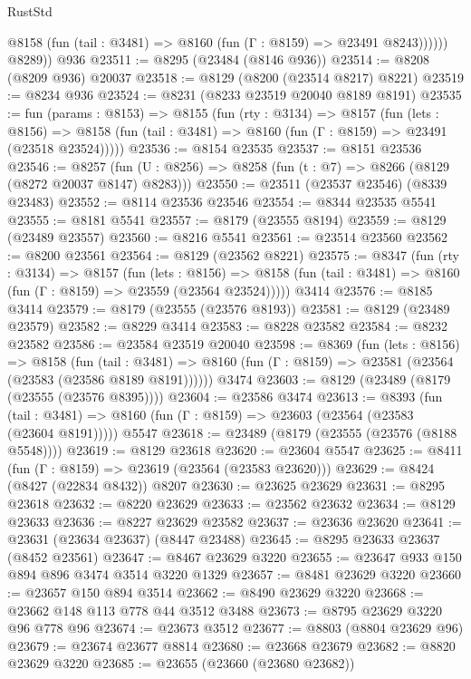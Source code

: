 \begin{lexlean}{RustStd}
\begin{coremodule}
              @8158 (fun (tail : @3481) => @8160 (fun (Γ : @8159) => @23491 @8243))))))
        @8289))
    @936
@23511 := @8295 (@23484 (@8146 @936))
@23514 := @8208 (@8209 @936) @20037
@23518 := @8129 (@8200 (@23514 @8217) @8221)
@23519 := @8234 @936
@23524 := @8231 (@8233 @23519 @20040 @8189 @8191)
@23535 := fun (params : @8153) =>
  @8155
    (fun (rty : @3134) =>
    @8157
      (fun (lets : @8156) =>
      @8158 (fun (tail : @3481) => @8160 (fun (Γ : @8159) => @23491 (@23518 @23524)))))
@23536 := @8154 @23535
@23537 := @8151 @23536
@23546 := @8257
    (fun (U : @8256) => @8258 (fun (t : @7) => @8266 (@8129 (@8272 @20037 @8147) @8283)))
@23550 := @23511 (@23537 @23546) (@8339 @23483)
@23552 := @8114 @23536 @23546
@23554 := @8344 @23535 @5541
@23555 := @8181 @5541
@23557 := @8179 (@23555 @8194)
@23559 := @8129 (@23489 @23557)
@23560 := @8216 @5541
@23561 := @23514 @23560
@23562 := @8200 @23561
@23564 := @8129 (@23562 @8221)
@23575 := @8347
    (fun (rty : @3134) =>
    @8157
      (fun (lets : @8156) =>
      @8158 (fun (tail : @3481) => @8160 (fun (Γ : @8159) => @23559 (@23564 @23524)))))
    @3414
@23576 := @8185 @3414
@23579 := @8179 (@23555 (@23576 @8193))
@23581 := @8129 (@23489 @23579)
@23582 := @8229 @3414
@23583 := @8228 @23582
@23584 := @8232 @23582
@23586 := @23584 @23519 @20040
@23598 := @8369
    (fun (lets : @8156) =>
    @8158
      (fun (tail : @3481) =>
      @8160 (fun (Γ : @8159) => @23581 (@23564 (@23583 (@23586 @8189 @8191))))))
    @3474
@23603 := @8129 (@23489 (@8179 (@23555 (@23576 @8395))))
@23604 := @23586 @3474
@23613 := @8393
    (fun (tail : @3481) => @8160 (fun (Γ : @8159) => @23603 (@23564 (@23583 (@23604 @8191)))))
    @5547
@23618 := @23489 (@8179 (@23555 (@23576 (@8188 @5548))))
@23619 := @8129 @23618
@23620 := @23604 @5547
@23625 := @8411 (fun (Γ : @8159) => @23619 (@23564 (@23583 @23620)))
@23629 := @8424 (@8427 (@22834 @8432)) @8207
@23630 := @23625 @23629
@23631 := @8295 @23618
@23632 := @8220 @23629
@23633 := @23562 @23632
@23634 := @8129 @23633
@23636 := @8227 @23629 @23582
@23637 := @23636 @23620
@23641 := @23631 (@23634 @23637) (@8447 @23488)
@23645 := @8295 @23633 @23637 (@8452 @23561)
@23647 := @8467 @23629 @3220
@23655 := @23647 @933 @150 @894 @896 @3474 @3514 @3220 @1329
@23657 := @8481 @23629 @3220
@23660 := @23657 @150 @894 @3514
@23662 := @8490 @23629 @3220
@23668 := @23662 @148 @113 @778 @44 @3512 @3488
@23673 := @8795 @23629 @3220 @96 @778 @96
@23674 := @23673 @3512
@23677 := @8803 (@8804 @23629 @96)
@23679 := @23674 @23677 @8814
@23680 := @23668 @23679
@23682 := @8820 @23629 @3220
@23685 := @23655 (@23660 (@23680 @23682))

\end{coremodule}
\end{lexlean}
